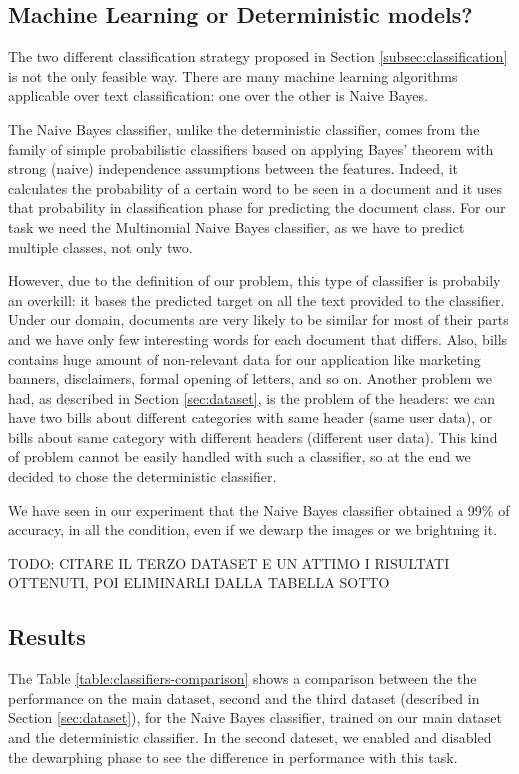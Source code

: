 \documentclass[10pt,twocolumn,letterpaper]{article}
\begin{document}
\subsection{Machine Learning or Deterministic models?}
\label{subsec:classification-naive-bayes}

The two different classification strategy proposed in Section
\ref{subsec:classification} is not the only feasible way. There are
many machine learning algorithms applicable over text classification:
one over the other is Naive Bayes.

The Naive Bayes classifier, unlike the deterministic classifier, comes
from the family of simple probabilistic classifiers based on applying
Bayes' theorem with strong (naive) independence assumptions between
the features. Indeed, it calculates the probability of a certain word
to be seen in a document and it uses that probability in
classification phase for predicting the document class. For our task
we need the Multinomial Naive Bayes classifier, as we have to predict
multiple classes, not only two.

However, due to the definition of our problem, this type of classifier
is probabily an overkill: it bases the predicted target on all the
text provided to the classifier. Under our domain, documents are very
likely to be similar for most of their parts and we have only few
interesting words for each document that differs. Also, bills contains
huge amount of non-relevant data for our application like marketing
banners, disclaimers, formal opening of letters, and so on. Another
problem we had, as described in Section \ref{sec:dataset}, is the
problem of the headers: we can have two bills about different
categories with same header (same user data), or bills about same
category with different headers (different user data). This kind of problem cannot be easily handled with such a classifier, so at the end we decided to chose the deterministic classifier.

We have seen in our experiment that the Naive Bayes classifier obtained a 99\% of accuracy, in all the condition, even if we dewarp the images or we brightning it. 

TODO: CITARE IL TERZO DATASET E UN ATTIMO I RISULTATI OTTENUTI, POI ELIMINARLI DALLA TABELLA SOTTO

\subsection{Results}

The Table \ref{table:classifiers-comparison} shows a comparison
between the the performance on the main dataset, second and the third dataset (described in Section
\ref{sec:dataset}), for the Naive Bayes classifier, trained on our
main dataset and the deterministic classifier. In the second dateset, we enabled and disabled the dewarphing phase to see the difference in performance with this task.
\end{document}
